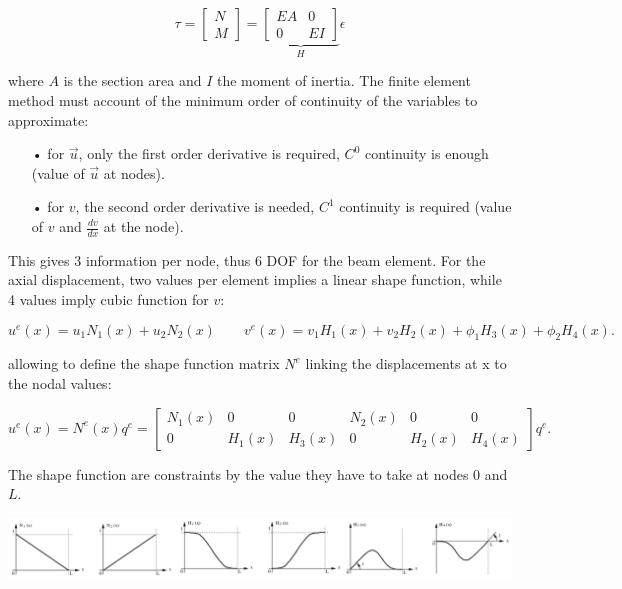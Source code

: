	\begin{equation}
	\tau = \left[
	\begin{array}{c}
	N\\
	M
	\end{array}		
	\right]
	=
	\underbrace{
	\left[
	\begin{array}{cc}
	EA & 0\\
	0 & EI
	\end{array}		
	\right]}_{H}
	\epsilon
	\end{equation}
	
	where $A$ is the section area and $I$ the moment of inertia. The finite element method must account of the minimum order of continuity of the variables to approximate: \\
	
	\begin{itemize}
	\item[•] for $\vec{u}$, only the first order derivative is required, $C^0$ continuity is enough (value of $\vec{u}$ at nodes).  
	\item[•] for $v$, the second order derivative is needed, $C^1$ continuity is required (value of $v$ and $\frac{dv}{dx}$ at the node). \\
	\end{itemize}
	
	This gives 3 information per node, thus 6 DOF for the beam element. For the axial displacement, two values per element implies a linear shape function, while 4 values imply cubic function for $v$: 
	
	\begin{equation}
	u^e (x) = u_1 N_1 (x) + u_2 N_2 (x)\qquad v^e (x) = v_1 H_1 (x) + v_2 H_2 (x) + \phi _1 H_3(x) + \phi _2 H_4(x).
\end{equation}	 

	allowing to define the shape function matrix $N^e$ linking the displacements at x to the nodal values: 
	
	\begin{equation}
	u^e(x) = N^e (x)q^e = \left[
	\begin{array}{cccccc}
	N_1(x) & 0 &0 & N_2(x) & 0 & 0\\
	0 & H_1(x) &H_3(x) & 0 & H_2(x) & H_4(x)
	\end{array}
	\right] q^e.
	\end{equation}
	
	The shape function are constraints by the value they have to take at nodes 0 and $L$. 
	
	\begin{center}
	\includegraphics[scale=0.4]{ch15/4}
	\end{center}
	
